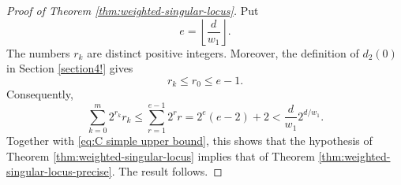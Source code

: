 \documentclass[12pt,reqno]{amsart}
\theoremstyle{definition}
\theoremstyle{remark}
\numberwithin{equation}{section}
\begin{document}
\begin{proof}[Proof of Theorem \ref{thm:weighted-singular-locus}]
Put
\[
    e=\left\lfloor\frac d{w_1}\right\rfloor.
\]
The numbers $r_k$ are distinct positive integers. Moreover, the
definition of $d_2(0)$ in Section \ref{section4!} gives
\[
    r_k\leq r_0\leq e-1.
\]
Consequently,
\[
\sum_{k=0}^{m}2^{r_k}r_k \leq\sum_{r=1}^{e-1}2^rr =2^e(e-2)+2 <\frac d{w_1}2^{d/w_1}.
\]
Together with \eqref{eq:C simple upper bound}, this shows that the
hypothesis of Theorem \ref{thm:weighted-singular-locus} implies that of
Theorem \ref{thm:weighted-singular-locus-precise}. The result follows.
\end{proof}


\printbibliography  %
\end{document}
